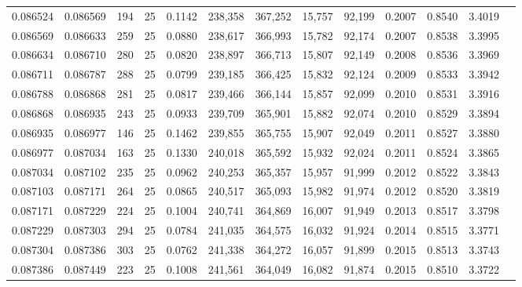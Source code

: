 \begin{tabular}{rrrrrrrrrrrrr}
0.086524 & 0.086569 &   194 &  25 &                                     0.1142 & 238,358 & 367,252 &  15,757 &  92,199 & 0.2007 & 0.8540 & 3.4019 \\
0.086569 & 0.086633 &   259 &  25 &                                     0.0880 & 238,617 & 366,993 &  15,782 &  92,174 & 0.2007 & 0.8538 & 3.3995 \\
0.086634 & 0.086710 &   280 &  25 &                                     0.0820 & 238,897 & 366,713 &  15,807 &  92,149 & 0.2008 & 0.8536 & 3.3969 \\
0.086711 & 0.086787 &   288 &  25 &                                     0.0799 & 239,185 & 366,425 &  15,832 &  92,124 & 0.2009 & 0.8533 & 3.3942 \\
0.086788 & 0.086868 &   281 &  25 &                                     0.0817 & 239,466 & 366,144 &  15,857 &  92,099 & 0.2010 & 0.8531 & 3.3916 \\
0.086868 & 0.086935 &   243 &  25 &                                     0.0933 & 239,709 & 365,901 &  15,882 &  92,074 & 0.2010 & 0.8529 & 3.3894 \\
0.086935 & 0.086977 &   146 &  25 &                                     0.1462 & 239,855 & 365,755 &  15,907 &  92,049 & 0.2011 & 0.8527 & 3.3880 \\
0.086977 & 0.087034 &   163 &  25 &                                     0.1330 & 240,018 & 365,592 &  15,932 &  92,024 & 0.2011 & 0.8524 & 3.3865 \\
0.087034 & 0.087102 &   235 &  25 &                                     0.0962 & 240,253 & 365,357 &  15,957 &  91,999 & 0.2012 & 0.8522 & 3.3843 \\
0.087103 & 0.087171 &   264 &  25 &                                     0.0865 & 240,517 & 365,093 &  15,982 &  91,974 & 0.2012 & 0.8520 & 3.3819 \\
0.087171 & 0.087229 &   224 &  25 &                                     0.1004 & 240,741 & 364,869 &  16,007 &  91,949 & 0.2013 & 0.8517 & 3.3798 \\
0.087229 & 0.087303 &   294 &  25 &                                     0.0784 & 241,035 & 364,575 &  16,032 &  91,924 & 0.2014 & 0.8515 & 3.3771 \\
0.087304 & 0.087386 &   303 &  25 &                                     0.0762 & 241,338 & 364,272 &  16,057 &  91,899 & 0.2015 & 0.8513 & 3.3743 \\
0.087386 & 0.087449 &   223 &  25 &                                     0.1008 & 241,561 & 364,049 &  16,082 &  91,874 & 0.2015 & 0.8510 & 3.3722 \\

\end{tabular}
